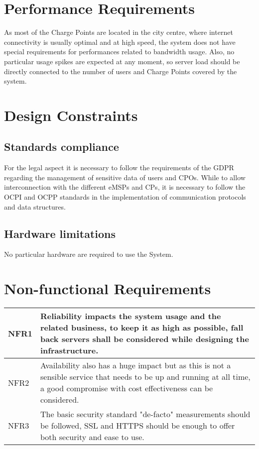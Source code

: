 \clearpage
\newpage

\section{Performance Requirements}
As most of the Charge Points are located in the city centre, where internet connectivity is usually optimal and at high speed, the system does not have special requirements for performances related to bandwidth usage. Also, no particular usage spikes are expected at any moment, so server load should be directly connected to the number of users and Charge Points covered by the system.

\section{Design Constraints}
\subsection{Standards compliance}
For the legal aspect it is necessary to follow the requirements of the GDPR regarding the management of sensitive data of users and CPOs. While to allow interconnection with the different eMSPs and CPs, it is necessary to follow the OCPI and OCPP standards in the implementation of communication protocols and data structures.

\subsection{Hardware limitations}
No particular hardware are required to use the System.

\section{Non-functional Requirements}

{
\setlength\extrarowheight{5pt}
\begin{tabular}{|p{3cm}|p{10cm}|}
	\hline
	NFR1 & Reliability impacts the system usage and the related business, to keep it as high as possible, fall back servers shall be considered while designing the infrastructure.\\
	\hline
	NFR2 & Availability also has a huge impact but as this is not a sensible service that needs to be up and running at all time, a good compromise with cost effectiveness can be considered.\\
	\hline
	NFR3 & The basic security standard "de-facto" measurements should be followed, SSL and HTTPS should be enough to offer both security and ease to use.\\
	\hline
\end{tabular}
}

